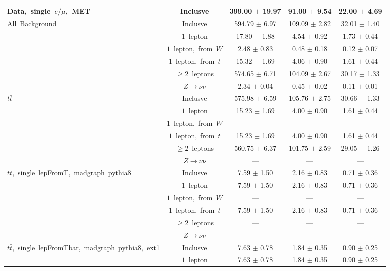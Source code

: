 \documentclass{article}
\begin{document}
\begin{longtable}{|l|c|c|c|c|}
\multirow{1}{*}{Data,~single~$e/\mu$,~MET} & Inclusve  & 399.00 $\pm$ 19.97  & 91.00 $\pm$ 9.54  & 22.00 $\pm$ 4.69 \\* 
\hline \hline 
\multirow{6}{*}{All~Background} & Inclusve  & 594.79 $\pm$ 6.97  & 109.09 $\pm$ 2.82  & 32.01 $\pm$ 1.40 \\* 
 & $1$~lepton  & 17.80 $\pm$ 1.88  & 4.54 $\pm$ 0.92  & 1.73 $\pm$ 0.44 \\* 
 & $1$~lepton,~from~$W$  & 2.48 $\pm$ 0.83  & 0.48 $\pm$ 0.18  & 0.12 $\pm$ 0.07 \\* 
 & $1$~lepton,~from~$t$  & 15.32 $\pm$ 1.69  & 4.06 $\pm$ 0.90  & 1.61 $\pm$ 0.44 \\* 
 & $\ge2$~leptons  & 574.65 $\pm$ 6.71  & 104.09 $\pm$ 2.67  & 30.17 $\pm$ 1.33 \\* 
 & $Z\rightarrow\nu\nu$  & 2.34 $\pm$ 0.04  & 0.45 $\pm$ 0.02  & 0.11 $\pm$ 0.01 \\* 
\hline 
\multirow{6}{*}{$t\bar{t}$} & Inclusve  & 575.98 $\pm$ 6.59  & 105.76 $\pm$ 2.75  & 30.66 $\pm$ 1.33 \\* 
 & $1$~lepton  & 15.23 $\pm$ 1.69  & 4.00 $\pm$ 0.90  & 1.61 $\pm$ 0.44 \\* 
 & $1$~lepton,~from~$W$  & ---  & ---  & --- \\* 
 & $1$~lepton,~from~$t$  & 15.23 $\pm$ 1.69  & 4.00 $\pm$ 0.90  & 1.61 $\pm$ 0.44 \\* 
 & $\ge2$~leptons  & 560.75 $\pm$ 6.37  & 101.75 $\pm$ 2.59  & 29.05 $\pm$ 1.26 \\* 
 & $Z\rightarrow\nu\nu$  & ---  & ---  & --- \\* 
\hline 
\multirow{6}{*}{$t\bar{t}$,~single~lepFromT,~madgraph~pythia8} & Inclusve  & 7.59 $\pm$ 1.50  & 2.16 $\pm$ 0.83  & 0.71 $\pm$ 0.36 \\* 
 & $1$~lepton  & 7.59 $\pm$ 1.50  & 2.16 $\pm$ 0.83  & 0.71 $\pm$ 0.36 \\* 
 & $1$~lepton,~from~$W$  & ---  & ---  & --- \\* 
 & $1$~lepton,~from~$t$  & 7.59 $\pm$ 1.50  & 2.16 $\pm$ 0.83  & 0.71 $\pm$ 0.36 \\* 
 & $\ge2$~leptons  & ---  & ---  & --- \\* 
 & $Z\rightarrow\nu\nu$  & ---  & ---  & --- \\* 
\hline 
\multirow{6}{*}{$t\bar{t}$,~single~lepFromTbar,~madgraph~pythia8,~ext1} & Inclusve  & 7.63 $\pm$ 0.78  & 1.84 $\pm$ 0.35  & 0.90 $\pm$ 0.25 \\* 
 & $1$~lepton  & 7.63 $\pm$ 0.78  & 1.84 $\pm$ 0.35  & 0.90 $\pm$ 0.25 \\* 

\end{longtable}
\end{document}

